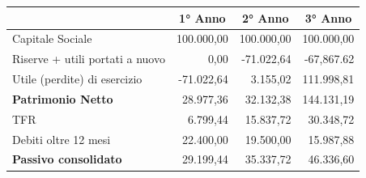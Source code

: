 \documentclass[12pt, a4paper]{article}
\begin{document}
\begin{center}
    \begin{tabular}{|l|r|r|r|}
        \hline
        \rowcolor[HTML]{CBCEFB}
        \multicolumn{1}{|c|}{\cellcolor[HTML]{CBCEFB}\textbf{PASSIVO}} & \multicolumn{1}{c|}{\cellcolor[HTML]{CBCEFB}\textbf{1° Anno}} & \multicolumn{1}{c|}{\cellcolor[HTML]{CBCEFB}\textbf{2° Anno}} & \multicolumn{1}{c|}{\cellcolor[HTML]{CBCEFB}\textbf{3° Anno}} \\ \hline
        Capitale Sociale                                               & 100.000,00                                                    & 100.000,00                                                    & 100.000,00                                                    \\ \hline
        Riserve + utili portati a nuovo                                & 0,00                                                          & -71.022,64                                                    & -67,867.62                                                    \\ \hline
        Utile (perdite) di esercizio                                   & -71.022,64                                                    & 3.155,02                                                      & 111.998,81                                                    \\ \hline
        \rowcolor[HTML]{EFEFEF}
        \textbf{Patrimonio Netto}                                      & 28.977,36                                                     & 32.132,38                                                     & 144.131,19                                                    \\ \hline
        TFR                                                            & 6.799,44                                                      & 15.837,72                                                     & 30.348,72                                                     \\ \hline
        Debiti oltre 12 mesi                                           & 22.400,00                                                     & 19.500,00                                                     & 15.987,88                                                     \\ \hline
        \rowcolor[HTML]{EFEFEF}
        \textbf{Passivo consolidato}                                   & 29.199,44                                                     & 35.337,72                                                     & 46.336,60                                                     \\ \hline

\end{tabular}
\end{center}
\end{document}
